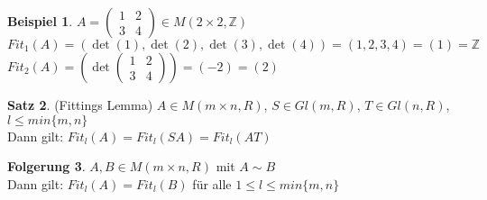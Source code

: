 \documentclass[10pt,a4paper,numbers=endperiod]{scrartcl}
\theoremstyle{definition}
\newtheorem{satz}{Satz}[section]
\newtheorem{bsp}[satz]{Beispiel}
\newtheorem{folg}[satz]{Folgerung}
\def\ZZ{{\mathbb Z}}
\begin{document}
\begin{bsp}
	$A = \begin{pmatrix}
	1 & 2\\
	3 & 4
	\end{pmatrix} \in M(2 \times 2, \ZZ)$\\
	$Fit_1(A) = (\det(1), \det(2), \det(3), \det(4)) = (1,2,3,4) = (1) = \ZZ$\\
	$Fit_2(A) = (\det \begin{pmatrix}
	1 & 2\\
	3 & 4
	\end{pmatrix}) = (-2) = (2)$
\end{bsp}

\begin{satz}
	(Fittings Lemma) $A \in M(m \times n, R)$, $S \in Gl(m, R)$, $T \in Gl(n,R)$, $l \leq min\{m,n\}$\\
	Dann gilt: $Fit_l(A) = Fit_l(SA) = Fit_l(AT)$
\end{satz}

\begin{folg}
	$A, B \in M(m \times n, R)$ mit $A \sim B$\\
	Dann gilt: $Fit_l(A) = Fit_l(B)$ für alle $1 \leq l \leq min\{m,n\}$
\end{folg}
\end{document}
